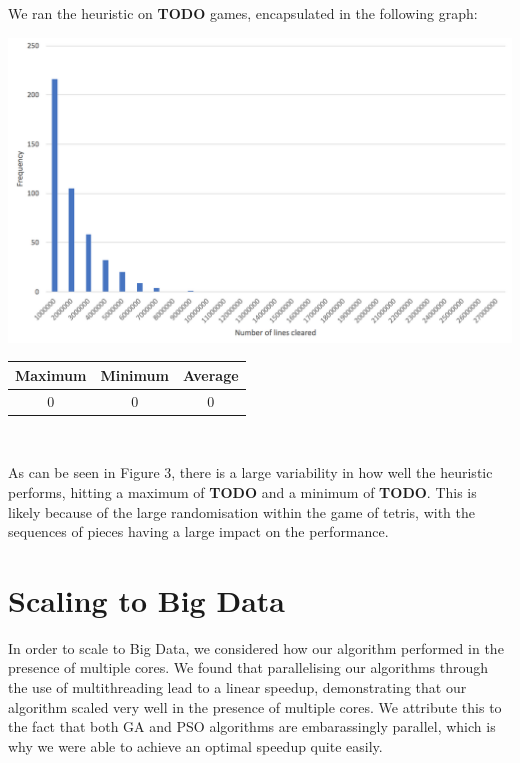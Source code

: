 \documentclass[12pt]{article}
\begin{document}
	We ran the heuristic on \textbf{TODO} games, encapsulated in the following graph:\\

	\begin{center}
		\begin{minipage}{0.4\textwidth}
			\includegraphics[scale=0.4]{heuristic/heuristic}
		\end{minipage}\begin{minipage}{0.4\textwidth}
		\begin{tabular}{ | c | c | c | }
			\hline
			Maximum & Minimum & Average \\ \hline
			0 & 0 & 0 \\ \hline
			\end{tabular}\\
		\end{minipage}
	\end{center}




	As can be seen in Figure $3$, there is a large variability in how
	well the heuristic performs, hitting a maximum of \textbf{TODO} and a minimum of \textbf{TODO}.
	This is likely because of the large randomisation within the game of tetris,
	with the sequences of pieces having a large impact on the performance.

	\vspace{-0.3cm}
    \section{Scaling to Big Data}
	\vspace{-0.3cm}
	In order to scale to Big Data, we considered how our algorithm performed in the presence
	of multiple cores. We found that parallelising our algorithms through the use
	of multithreading lead to a linear speedup, demonstrating that our algorithm scaled very
	well in the presence of multiple cores. We attribute this to the fact that
	both GA and PSO algorithms are embarassingly parallel, which
	is why we were able to achieve an optimal speedup quite easily.\\
\end{document}
